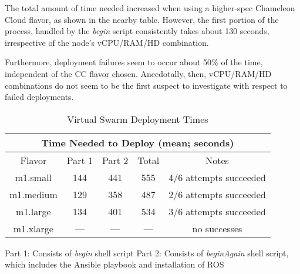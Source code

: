 \documentclass[9pt,twocolumn,twoside]{../../styles/osajnl}
\begin{document}
The total amount of time needed increased when using a higher-spec Chameleon Cloud flavor, as shown in the nearby table.  However, the first portion of the process, handled by the \textit{begin} script consistently takes about 130 seconds, irrespective of the node's vCPU/RAM/HD combination.  

Furthermore, deployment failures seem to occur about 50\% of the time, independent of the CC flavor chosen.  Anecdotally, then, vCPU/RAM/HD combinations do not seem to be the first suspect to investigate with respect to failed deployments.

\begin{table} [htbp]
  \begin{threeparttable}
  \centering
  \caption{Virtual Swarm Deployment Times}
    \begin{tabular}{ccccc}
      \multicolumn{5}{c}{\bf Time Needed to Deploy (mean; seconds)}\\ \hline Flavor & Part 1 & Part 2 & Total & Notes\\ \hline m1.small & 144 & 441 & 555 & 4/6 attempts succeeded \\ m1.medium & 129 & 358 & 487 & 2/6 attempts succeeded \\ m1.large & 134 & 401 & 534 & 3/6 attempts succeeded \\ m1.xlarge & --- & --- & --- & no successes\\ \hline
    \end{tabular}
    \begin{tablenotes}
      \small
      \item Part 1: Consists of \textit{begin} shell script \newline  Part 2: Consists of \textit{beginAgain} shell script, which includes the Ansible playbook and installation of ROS 
    \end{tablenotes}
  \end{threeparttable}
\end{table}
\end{document}
